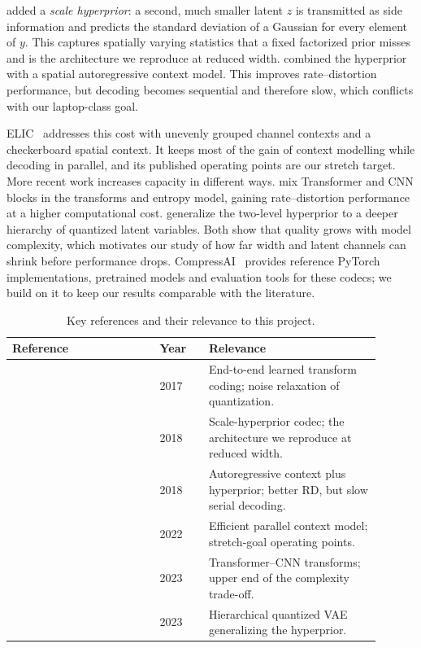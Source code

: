 \documentclass[11pt]{article}
\begin{document}
\citet{balle2018scalehyperprior} added a \emph{scale hyperprior}: a second, much
smaller latent $z$ is transmitted as side information and predicts the standard
deviation of a Gaussian for every element of $y$. This captures spatially varying
statistics that a fixed factorized prior misses and is the architecture we
reproduce at reduced width. \citet{minnen2018joint} combined the hyperprior with a
spatial autoregressive context model. This improves rate--distortion performance,
but decoding becomes sequential and therefore slow, which conflicts with our
laptop-class goal.

ELIC~\citep{he2022elic} addresses this cost with unevenly grouped channel contexts
and a checkerboard spatial context. It keeps most of the gain of context modelling
while decoding in parallel, and its published operating points are our stretch
target. More recent work increases capacity in different ways.
\citet{liu2023tcm} mix Transformer and CNN blocks in the transforms and entropy
model, gaining rate--distortion performance at a higher computational cost.
\citet{duan2023qresvae} generalize the two-level hyperprior to a deeper hierarchy of
quantized latent variables. Both show that quality grows with model complexity,
which motivates our study of how far width and latent channels can shrink before
performance drops. CompressAI~\citep{begaint2020compressai} provides reference
PyTorch implementations, pretrained models and evaluation tools for these codecs;
we build on it to keep our results comparable with the literature.

\begin{table}[htbp]
\centering
\caption{Key references and their relevance to this project.}
\begin{tabular}{@{}p{0.36\linewidth}p{0.12\linewidth}p{0.42\linewidth}@{}}
\toprule
\textbf{Reference} & \textbf{Year} & \textbf{Relevance} \\
\midrule
\citep{balle2017endtoend} & 2017 & End-to-end learned transform coding; noise relaxation of quantization. \\
\citep{balle2018scalehyperprior} & 2018 & Scale-hyperprior codec; the architecture we reproduce at reduced width. \\
\citep{minnen2018joint} & 2018 & Autoregressive context plus hyperprior; better RD, but slow serial decoding. \\
\citep{he2022elic} & 2022 & Efficient parallel context model; stretch-goal operating points. \\
\citep{liu2023tcm} & 2023 & Transformer--CNN transforms; upper end of the complexity trade-off. \\
\citep{duan2023qresvae} & 2023 & Hierarchical quantized VAE generalizing the hyperprior. \\
\bottomrule
\end{tabular}
\end{table}
\end{document}
